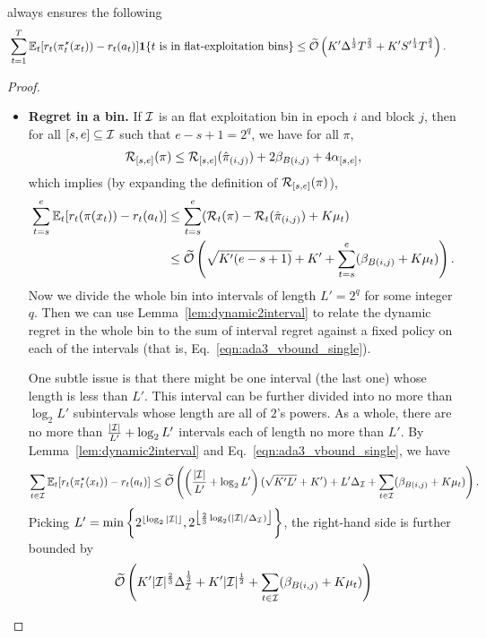 \begin{lemma}
\label{lemma:dynamic flat exploitation}
\AdaBIN always ensures the following
\begin{align*}
&\sum_{t=1}^T\mathbb{E}_t[r_t(\pi_t^\star(x_t))-r_t(a_t)]\boldsymbol{1}\{t \text{ is in flat-exploitation bins}\}
\leq \widetilde{\mathcal{O}}\left(K^{\prime}\Delta^{\frac{1}{3}}T^{\frac{2}{3}} + K^\prime S^{\prime \frac{1}{4}}T^{\frac{3}{4}} \right).
\end{align*}
\end{lemma}
\begin{proof}
\begin{itemize}[leftmargin=*]
\item \textbf{Regret in a bin.} 
If ${\mathcal{I}}$ is an flat exploitation bin in epoch $i$ and block $j$, then for all $[s,e]\subseteq {\mathcal{I}}$ such that $e-s+1=2^q$, we have for all $\pi$,
\begin{align*}
{\mathcal{R}}_{[s,e]}(\pi)\leq {\mathcal{R}}_{[s,e]}(\hat{\pi}_{(i,j)}) + 2\beta_{B(i,j)}+4\alpha_{[s,e]},
\end{align*}
which implies (by expanding the definition of ${\mathcal{R}}_{[s,e]}(\pi)$),
\begin{align}
\sum_{t=s}^{e} \mathbb{E}_t[r_t(\pi(x_t))-r_t(a_t)]&\leq \sum_{t=s}^{e} ({\mathcal{R}}_t(\pi)-{\mathcal{R}}_t(\hat{\pi}_{(i,j)})+K\mu_t) \nonumber \\
&\leq \widetilde{\mathcal{O}}\left( \sqrt{K^\prime (e-s+1)} + K^\prime + \sum_{t=s}^e (\beta_{B(i,j)}+K\mu_t)\right). \label{eqn:ada3_vbound_single}
\end{align}
Now we divide the whole bin into intervals of length $L'=2^q$ for some integer $q$. Then we can use Lemma~\ref{lem:dynamic2interval} to relate the dynamic regret in the whole bin to the sum of interval regret against a fixed policy on each of the intervals (that is, Eq.~\eqref{eqn:ada3_vbound_single}).

One subtle issue is that there might be one interval (the last one) whose length is less than $L'$. This interval can be further divided into no more than $\log_2L'$ subintervals whose length are all of $2$'s powers. As a whole, there are no more than $\frac{|{\mathcal{I}}|}{L'}+\log_2 L'$ intervals each of length no more than $L'$. By Lemma~\ref{lem:dynamic2interval} and Eq.~\eqref{eqn:ada3_vbound_single}, we have
\begin{align*}
\sum_{t\in{\mathcal{I}}} \mathbb{E}_t[r_t(\pi_t^\star(x_t))-r_t(a_t)]\leq \widetilde{\mathcal{O}}\left( \left(\frac{|{\mathcal{I}}|}{L'} + \log_2 L'\right)(\sqrt{K'L'}+K') + L'\Delta_{\mathcal{I}} + \sum_{t\in{\mathcal{I}}} (\beta_{B(i,j)}+K\mu_t)\right). 
\end{align*}
Picking $ L'= \min\left\{2^{\lfloor\log_2|{\mathcal{I}}|\rfloor}, 2^{ \big\lfloor \frac{2}{3} \log_2 (|{\mathcal{I}}|/\Delta_{\mathcal{I}})\big\rfloor } \right\} $, the right-hand side is further bounded by 
\begin{align*}
\widetilde{\mathcal{O}}\left(  K'|{\mathcal{I}}|^{\frac{2}{3}}\Delta_{\mathcal{I}}^{\frac{1}{3}} + K'|{\mathcal{I}}|^{\frac{1}{2}} + \sum_{t\in{\mathcal{I}}} (\beta_{B(i,j)}+K\mu_t)\right)
\end{align*}


\end{itemize}
\end{proof}
